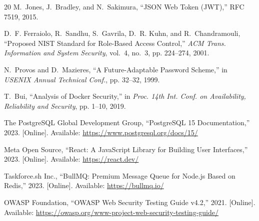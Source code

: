 \documentclass[conference]{IEEEtran}
\begin{document}
\begin{thebibliography}{20}
M.~Jones, J.~Bradley, and N.~Sakimura, ``JSON Web Token (JWT),'' RFC 7519, 2015.

D.~F. Ferraiolo, R.~Sandhu, S.~Gavrila, D.~R. Kuhn, and R.~Chandramouli, ``Proposed NIST Standard for Role-Based Access Control,'' \textit{ACM Trans. Information and System Security}, vol.~4, no.~3, pp. 224--274, 2001.

N.~Provos and D.~Mazieres, ``A Future-Adaptable Password Scheme,'' in \textit{USENIX Annual Technical Conf.}, pp. 32--32, 1999.

T.~Bui, ``Analysis of Docker Security,'' in \textit{Proc. 14th Int. Conf. on Availability, Reliability and Security}, pp. 1--10, 2019.

The PostgreSQL Global Development Group, ``PostgreSQL 15 Documentation,'' 2023. [Online]. Available: \url{https://www.postgresql.org/docs/15/}

Meta Open Source, ``React: A JavaScript Library for Building User Interfaces,'' 2023. [Online]. Available: \url{https://react.dev/}

Taskforce.sh Inc., ``BullMQ: Premium Message Queue for Node.js Based on Redis,'' 2023. [Online]. Available: \url{https://bullmq.io/}

OWASP Foundation, ``OWASP Web Security Testing Guide v4.2,'' 2021. [Online]. Available: \url{https://owasp.org/www-project-web-security-testing-guide/}

\end{thebibliography}
\end{document}
